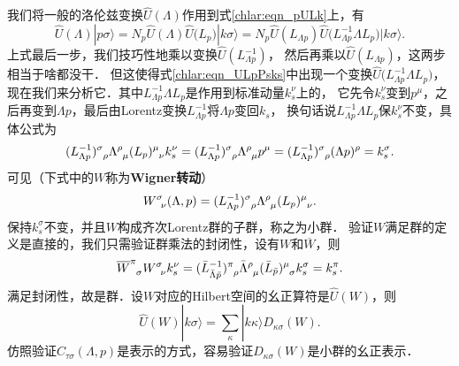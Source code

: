 我们将一般的洛伦兹变换$\hat{U}(\Lambda)$作用到式\eqref{chlar:eqn_pULk}上，有
\begin{equation}\label{chlar:eqn_ULpPsks}
	\hat{U}(\Lambda) |p\sigma\rangle = N_p \hat{U}(\Lambda) \hat{U}\bigl(L_p\bigr) |k\sigma\rangle
	= N_p \hat{U}(L_{\Lambda p}) \hat{U}\bigl(L^{-1}_{\Lambda p}\Lambda L_p\bigr) |k\sigma\rangle .
\end{equation}
上式最后一步，我们技巧性地乘以变换$\hat{U}(L^{-1}_{\Lambda p})$，
然后再乘以$\hat{U}(L_{\Lambda p})$，这两步相当于啥都没干．
但这使得式\eqref{chlar:eqn_ULpPsks}中出现一个变换$\hat{U}\bigl(L^{-1}_{\Lambda p}\Lambda L_p\bigr)$，
现在我们来分析它．其中$L^{-1}_{\Lambda p}\Lambda L_p$是作用到标准动量$k^\nu_s$上的，
它先令$k^\nu_s$变到$p^\mu$，之后再变到$\Lambda p$，最后由Lorentz变换$L^{-1}_{\Lambda p}$将$\Lambda p$变回$k_s$，
换句话说$L^{-1}_{\Lambda p}\Lambda L_p$保$k^\nu_s$不变，具体公式为
\begin{equation}
	(L^{-1}_{\Lambda p})^\sigma_{\hphantom{\sigma}\rho} \Lambda^\rho_{\hphantom{\rho}\mu}
	(L_p)^\mu_{\hphantom{\mu}\nu} k^\nu_s 
	= (L^{-1}_{\Lambda p})^\sigma_{\hphantom{\sigma}\rho} \Lambda^\rho_{\hphantom{\rho}\mu} p^\mu
	= (L^{-1}_{\Lambda p})^\sigma_{\hphantom{\sigma}\rho} (\Lambda p)^\rho	= k^\sigma_s .
\end{equation}
可见（下式中的$W$称为{\heiti \bfseries Wigner转动}）
\begin{equation}\label{chlar:eqn_Wigner-rotation}
	W^\sigma_{\hphantom{\sigma}\nu}(\Lambda,p) = (L^{-1}_{\Lambda p})^\sigma_{\hphantom{\sigma}\rho} 
	\Lambda^\rho_{\hphantom{\rho}\mu}(L_p)^\mu_{\hphantom{\mu}\nu} .
\end{equation}
保持$k^\sigma_s$不变，并且$W$构成齐次Lorentz群的子群，称之为{\heiti 小群}．
验证$W$满足群的定义是直接的，我们只需验证群乘法的封闭性，设有$W$和$\overline{W}$，则
\begin{align*}
	\overline{W}^\pi_{\hphantom{\pi}\sigma} W^\sigma_{\hphantom{\sigma}\nu} k^\nu_s
	=(\bar{L}^{-1}_{\bar{\Lambda} \bar{p}})^\pi_{\hphantom{\sigma}\rho} \bar{\Lambda}^\rho_{\hphantom{\rho}\mu}
	(\bar{L}_{\bar{p}})^\mu_{\hphantom{\mu}\sigma} k^\sigma_s = k^\pi_s .
\end{align*}
满足封闭性，故是群．设$W$对应的Hilbert空间的幺正算符是$\hat{U}(W)$，则
\begin{equation}\label{chlar:eqn_UWk}
	\hat{U}(W) |k\sigma\rangle = \sum_{\kappa} |k\kappa\rangle D_{\kappa \sigma}(W) .
\end{equation}
仿照验证$C_{\tau \sigma}(\Lambda,p)$是表示的方式，容易验证$D_{\kappa \sigma}(W)$是小群的幺正表示．

